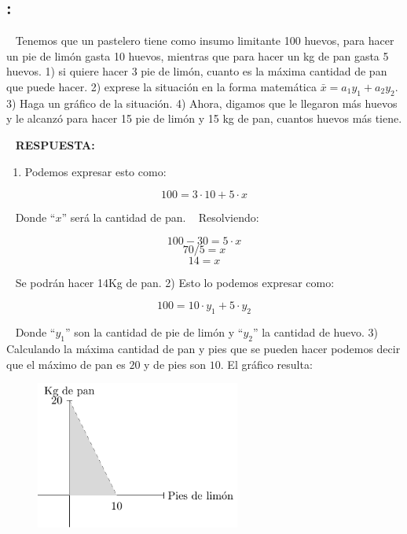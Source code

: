 \documentclass[
  letterpaper,
  DIV=11,
  numbers=noendperiod]{scrreport}
\providecommand{\tightlist}{%
  \setlength{\itemsep}{0pt}\setlength{\parskip}{0pt}}\usepackage{longtable,booktabs,array}
\begin{document}
\hypertarget{section-23}{%
\subsection{:}\label{section-23}}

~ Tenemos que un pastelero tiene como insumo limitante 100 huevos, para
hacer un pie de limón gasta 10 huevos, mientras que para hacer un kg de
pan gasta 5 huevos. 1) si quiere hacer 3 pie de limón, cuanto es la
máxima cantidad de pan que puede hacer. 2) exprese la situación en la
forma matemática \(\bar x=a_1y_1+a_2y_2\). 3) Haga un gráfico de la
situación. 4) Ahora, digamos que le llegaron más huevos y le alcanzó
para hacer 15 pie de limón y 15 kg de pan, cuantos huevos más tiene.

~ \textbf{RESPUESTA:}

\begin{enumerate}
\def\labelenumi{\arabic{enumi})}
\tightlist
\item
  Podemos expresar esto como:
\end{enumerate}

\[
100=3\cdot 10 +5 \cdot x
\]

~ Donde ``\(x\)'' será la cantidad de pan. ~ Resolviendo:

\[
100-30= 5 \cdot x
\] \[
70/5= x
\] \[
14= x
\]

~ Se podrán hacer 14Kg de pan. 2) Esto lo podemos expresar como:

\[
100=10\cdot y_1+ 5\cdot y_2
\]

~ Donde ``\(y_1\)'' son la cantidad de pie de limón y ``\(y_2\)'' la
cantidad de huevo. 3) Calculando la máxima cantidad de pan y pies que se
pueden hacer podemos decir que el máximo de pan es \(20\) y de pies son
\(10\). El gráfico resulta:

\begin{figure}

{\centering \includegraphics[width=0.6\textwidth,height=\textheight]{8ej_pauta_files/figure-pdf/unnamed-chunk-1-1.pdf}

}

\end{figure}
\end{document}
